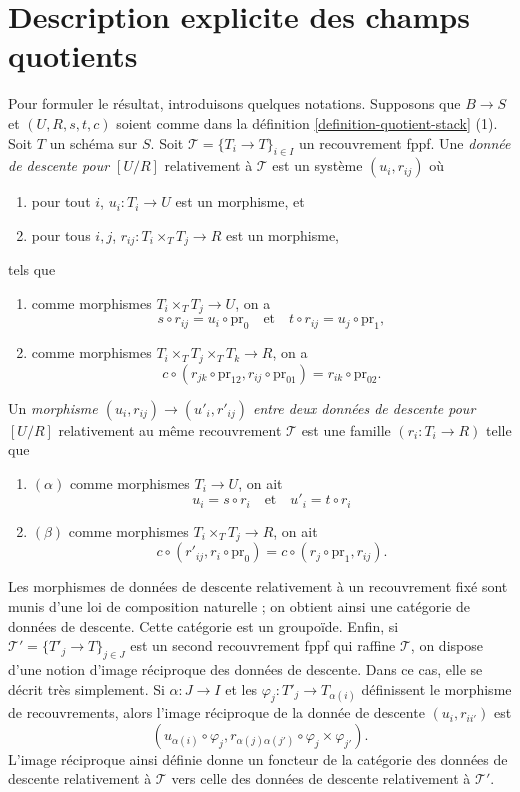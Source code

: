 \section{Description explicite des champs quotients}
\label{section-explicit-quotient-stacks}

\noindent
Pour formuler le résultat, introduisons quelques notations. Supposons que $B \to S$ et $(U, R, s, t, c)$ soient comme dans la définition \ref{definition-quotient-stack} (1). Soit $T$ un schéma sur $S$. Soit $\mathcal{T} = \{T_i \to T\}_{i \in I}$ un recouvrement fppf. Une {\it donnée de descente pour $[U/R]$} relativement à $\mathcal{T}$ est un système $(u_i, r_{ij})$ où
\begin{enumerate}
\item pour tout $i$, $u_i : T_i \to U$ est un morphisme, et
\item pour tous $i, j$, $r_{ij} : T_i \times_T T_j \to R$ est un morphisme,
\end{enumerate}
tels que
\begin{enumerate}
\item [(a)] comme morphismes $T_i \times_T T_j \to U$, on a
$$
s \circ r_{ij} = u_i \circ \text{pr}_0
\quad\text{et}\quad
t \circ r_{ij} = u_j \circ \text{pr}_1,
$$
\item [(b)] comme morphismes $T_i \times_T T_j \times_T T_k \to R$, on a
$$
c \circ (r_{jk} \circ \text{pr}_{12}, r_{ij} \circ \text{pr}_{01})
= r_{ik} \circ \text{pr}_{02}.
$$
\end{enumerate}
Un {\it morphisme $(u_i, r_{ij}) \to (u'_i, r'_{ij})$ entre deux données de descente pour $[U/R]$} relativement au même recouvrement $\mathcal{T}$ est une famille $(r_i : T_i \to R)$ telle que
\begin{enumerate}
\item [] $(\alpha)$ comme morphismes $T_i \to U$, on ait
$$
u_i = s \circ r_i
\quad\text{et}\quad
u'_i = t \circ r_i
$$
\item [] $(\beta)$ comme morphismes $T_i \times_T T_j \to R$, on ait
$$
c \circ (r'_{ij}, r_i \circ \text{pr}_0)
=
c \circ (r_j \circ \text{pr}_1, r_{ij}).
$$
\end{enumerate}
Les morphismes de données de descente relativement à un recouvrement fixé sont munis d'une loi de composition naturelle ; on obtient ainsi une catégorie de données de descente. Cette catégorie est un groupoïde. Enfin, si $\mathcal{T}' = \{T'_j \to T\}_{j \in J}$ est un second recouvrement fppf qui raffine $\mathcal{T}$, on dispose d'une notion d'image réciproque des données de descente. Dans ce cas, elle se décrit très simplement. Si $\alpha : J \to I$ et les $\varphi_j : T'_j \to T_{\alpha(i)}$ définissent le morphisme de recouvrements, alors l'image réciproque de la donnée de descente $(u_i, r_{ii'})$ est
$$
(u_{\alpha(i)} \circ \varphi_j,
r_{\alpha(j)\alpha(j')} \circ \varphi_j \times \varphi_{j'}).
$$
L'image réciproque ainsi définie donne un foncteur de la catégorie des données de descente relativement à $\mathcal{T}$ vers celle des données de descente relativement à $\mathcal{T}'$.

